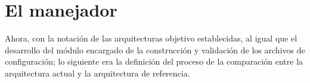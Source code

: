 
\section{El manejador}

Ahora, con la notación de las arquitecturas objetivo establecidas, al igual que el desarrollo del módulo encargado de la construcción y validación de los archivos de configuración; lo siguiente era la definición del proceso de la comparación entre la arquitectura actual y la arquitectura de referencia. 